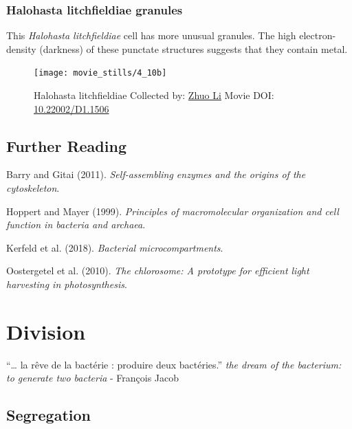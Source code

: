 \documentclass[]{tufte-book}
\begin{document}
\hypertarget{Halohasta_litchfieldiae_granules}{\subsection{Halohasta
litchfieldiae granules}\label{Halohasta_litchfieldiae_granules}}

This \emph{Halohasta litchfieldiae} cell has more unusual granules. The
high electron-density (darkness) of these punctate structures suggests
that they contain metal.





\begin{figure}
\texttt{[image: movie\_stills/4\_10b]} \caption[Halohasta litchfieldiae Collected by:
\protect\hyperlink{zhuo_li}{Zhuo Li} Movie DOI:
\href{https://doi.org/10.22002/D1.1506}{10.22002/D1.1506}]{Halohasta litchfieldiae Collected by:
\protect\hyperlink{zhuo_li}{Zhuo Li} Movie DOI:
\href{https://doi.org/10.22002/D1.1506}{10.22002/D1.1506}}\label{fig:4-10b}
\end{figure}

\section{Further Reading}\label{further-reading-3}

Barry and Gitai (2011). \emph{Self-assembling enzymes and the origins of
the cytoskeleton}.\citep{barry2011}

Hoppert and Mayer (1999). \emph{Principles of macromolecular
organization and cell function in bacteria and
archaea}.\citep{hoppert1999}

Kerfeld et al. (2018). \emph{Bacterial
microcompartments}.\citep{kerfeld2018}

Oostergetel et al. (2010). \emph{The chlorosome: A prototype for
efficient light harvesting in photosynthesis}.\citep{oostergetel2010}

\chapter{Division}\label{division}

``\ldots{} la rêve de la bactérie : produire deux bactéries.'' \emph{the
dream of the bacterium: to generate two bacteria} - François Jacob
\citep{jacob2002a}

\section{Segregation}\label{segregation}
\end{document}
